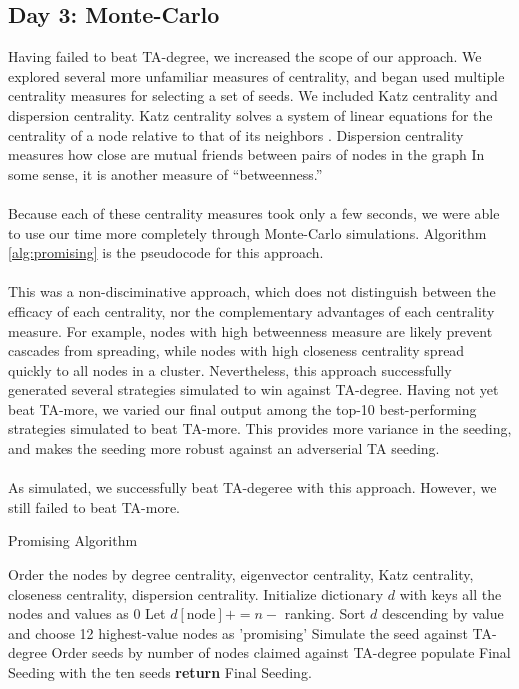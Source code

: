\documentclass[letterpaper, 11pt]{article}
\begin{document}
\subsection{Day 3: Monte-Carlo}
Having failed to beat TA-degree, we increased the scope of our approach. We explored several more unfamiliar measures of centrality, and began used multiple centrality measures for selecting a set of seeds. We included Katz centrality and dispersion centrality.
Katz centrality solves a system of linear equations for the centrality of a node relative to that of its neighbors \cite{networkx}.
Dispersion centrality measures how close are mutual friends between pairs of nodes in the graph \cite{networkx} %
In some sense, it is another measure of ``betweenness.''
\\\\
Because each of these centrality measures took only a few seconds, we were able to use our time more completely through Monte-Carlo simulations. Algorithm \ref{alg:promising} is the pseudocode for this approach.
\\\\
This was a non-disciminative approach, which does not distinguish between the efficacy of each centrality, nor the complementary advantages of each centrality measure. For example, nodes with high betweenness measure are likely prevent cascades from spreading, while nodes with high closeness centrality spread quickly to all nodes in a cluster. Nevertheless, this approach successfully generated several strategies simulated to win against TA-degree. Having not yet beat TA-more, we varied our final output among the top-10 best-performing strategies simulated to beat TA-more. This provides more variance in the seeding, and makes the seeding more robust against an adverserial TA seeding.
\\\\
As simulated, we successfully beat TA-degeree with this approach. However, we still failed to beat TA-more.

\begin{algorithm}
\caption{Promising Algorithm}
\begin{algorithmic}[1]
\State Order the nodes by degree centrality, eigenvector centrality, Katz centrality, closeness centrality, dispersion centrality.
\State Initialize dictionary $d$ with keys all the nodes and values as 0
\State Let $d[\text{node}] += n - $ ranking.
\EndFor
\EndFor
\State Sort $d$ descending by value and choose 12 highest-value nodes as 'promising'
\State Simulate the seed against TA-degree
\EndFor
\State Order seeds by number of nodes claimed against TA-degree
\State populate Final Seeding with the ten seeds
\EndFor
\EndWhile
\EndProcedure
\State \textbf{return} Final Seeding.
\end{algorithmic}
\label{alg:promising}
\end{algorithm}
\end{document}
